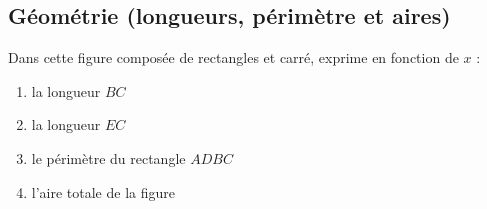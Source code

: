 \documentclass[a4paper,10pt]{report}
\begin{document}
\subsection{Géométrie (longueurs, périmètre et aires)}

\noindent \begin{minipage}[t]{8.7cm}
Dans cette figure composée de rectangles et carré, exprime en fonction de $x$ :
\begin{enumerate}
\item[•] la longueur $BC$
\item[•] la longueur $EC$
\item[•] le périmètre du rectangle $ADBC$
\item[•] l'aire totale de la figure
\end{enumerate}

\medskip
\noindent\grandscarreaux{\linewidth}{2.6cm}
\end{minipage}
\hfill
\end{document}
